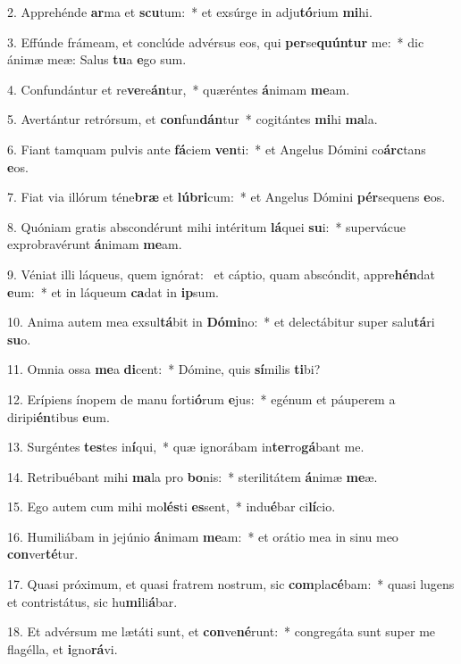 2. Apprehénde \textbf{ar}ma et \textbf{scu}tum:~*  et exsúrge in adju\textbf{tó}rium \textbf{mi}hi.\

3. Effúnde frámeam, et conclúde advérsus eos, qui \textbf{per}se\textbf{quún}\textbf{tur} me:~*  dic ánimæ meæ: Salus \textbf{tu}a \textbf{e}go sum.\

4. Confundántur et re\textbf{ve}re\textbf{án}tur,~*  quæréntes \textbf{á}nimam \textbf{me}am.\

5. Avertántur retrórsum, et \textbf{con}fun\textbf{dán}tur~*  cogitántes \textbf{mi}hi \textbf{ma}la.\

6. Fiant tamquam pulvis ante \textbf{fá}ciem \textbf{ven}ti:~*  et Angelus Dómini co\textbf{árc}tans \textbf{e}os.\

7. Fiat via illórum téne\textbf{bræ} et \textbf{lú}\textbf{bri}cum:~*  et Angelus Dómini \textbf{pér}sequens \textbf{e}os.\

8. Quóniam gratis abscondérunt mihi intéritum \textbf{lá}quei \textbf{su}i:~*  supervácue exprobravérunt \textbf{á}nimam \textbf{me}am.\

9. Véniat illi láqueus, quem ignórat: \dag\  et cáptio, quam abscóndit, appre\textbf{hén}dat \textbf{e}um:~*  et in láqueum \textbf{ca}dat in \textbf{ip}sum.\

10. Anima autem mea exsul\textbf{tá}bit in \textbf{Dó}\textbf{mi}no:~*  et delectábitur super salu\textbf{tá}ri \textbf{su}o.\

11. Omnia ossa \textbf{me}a \textbf{di}cent:~*  Dómine, quis \textbf{sí}milis \textbf{ti}bi?\

12. Erípiens ínopem de manu forti\textbf{ó}rum \textbf{e}jus:~*  egénum et páuperem a diripi\textbf{én}tibus \textbf{e}um.\

13. Surgéntes \textbf{tes}tes in\textbf{í}qui,~*  quæ ignorábam in\textbf{ter}ro\textbf{gá}bant me.\

14. Retribuébant mihi \textbf{ma}la pro \textbf{bo}nis:~*  sterilitátem \textbf{á}nimæ \textbf{me}æ.\

15. Ego autem cum mihi mo\textbf{lés}ti \textbf{es}sent,~*  indu\textbf{é}bar ci\textbf{lí}cio.\

16. Humiliábam in jejúnio \textbf{á}nimam \textbf{me}am:~*  et orátio mea in sinu meo \textbf{con}ver\textbf{té}tur.\

17. Quasi próximum, et quasi fratrem nostrum, sic \textbf{com}pla\textbf{cé}bam:~*  quasi lugens et contristátus, sic hu\textbf{mi}li\textbf{á}bar.\

18. Et advérsum me lætáti sunt, et \textbf{con}ve\textbf{né}runt:~*  congregáta sunt super me flagélla, et \textbf{i}gno\textbf{rá}vi.\

